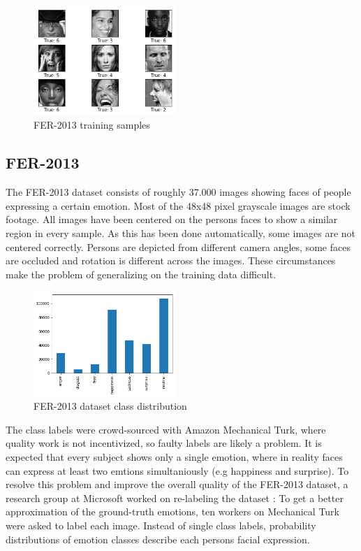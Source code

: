 \documentclass[twoside]{article}
\begin{document}
\begin{multicols}{2}
\begin{figure}[H]
	\includegraphics[width=0.48\textwidth]{fer_examples}
	\caption{FER-2013 training samples}
\end{figure}


\subsection{FER-2013}
The FER-2013 dataset consists of roughly 37.000 images showing faces of people expressing a certain emotion. Most of the 48x48 pixel grayscale images are stock footage. All images have been centered on the persons faces to show a similar region in every sample. As this has been done automatically, some images are not centered correctly. Persons are depicted from different camera angles, some faces are occluded and rotation is different across the images. These circumstances make the problem of generalizing on the training data difficult. 

\begin{figure}[H]
	\includegraphics[width=0.48\textwidth]{ferplus_distribution}
	\caption{FER-2013 dataset class distribution}
\end{figure}

The class labels were crowd-sourced with Amazon Mechanical Turk, where quality work is not incentivized, so faulty labels are likely a problem. It is expected that every subject shows only a single emotion, where in reality faces can express at least two emtions simultaniously (e.g happiness and surprise). To resolve this problem and improve the overall quality of the FER-2013 dataset, a research group at Microsoft worked on re-labeling the dataset \cite{barsoum16}: To get a better approximation of the ground-truth emotions, ten workers on Mechanical Turk were asked to label each image. Instead of single class labels, probability distributions of emotion classes describe each persons facial expression.


\end{multicols}
\end{document}
